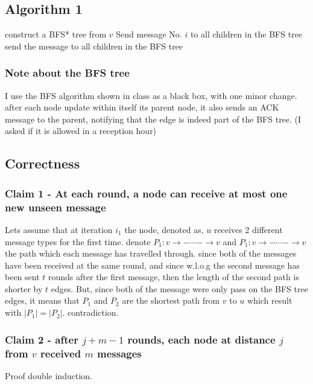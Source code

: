 \documentclass[11pt]{article}
\begin{document}
\subsection{Algorithm 1}

\begin{algorithmic}[1]

\State construct a BFS* tree from $v$
    \State Send message No. $i$ to all children in the BFS tree
    \EndFor
\Else
        \State send the message to all children in the BFS tree
    \EndIf
\EndIf
\end{algorithmic}

\subsubsection*{Note about the BFS tree}
I use the BFS algorithm shown in class as a black box, with one minor change. after each node update within itself its parent node, it also sends an ACK message to the parent, notifying that the edge is indeed part of the BFS tree. (I asked if it is allowed in a reception hour)

\subsection*{Correctness}

\subsubsection{Claim 1 - At each round, a node can receive at most one new unseen message}
Lets assume that at iteration $i_1$ the node, denoted as, $u$ receives 2 different message types for the first time. denote $P_1: v\rightarrow - \cdots - \rightarrow v$ and $P_1: v\rightarrow - \cdots - \rightarrow v$ the path which each message has travelled through. since both of the messages have been received at the same round, and since w.l.o.g the second message has been sent $t$ rounds after the first message, then the length of the second path is shorter by $t$ edges. But, since both of the message were only pass on the BFS tree edges, it means that $P_1$ and $P_2$ are the shortest path from $v$ to $u$ which result with $|P_1| = |P_2|$. contradiction.

\subsubsection{Claim 2 - after $j+m-1$ rounds, each node at distance $j$ from $v$ received $m$ messages}
Proof double induction.
\end{document}
